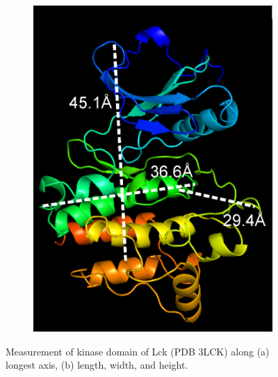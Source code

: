 \documentclass[../AdvancementSummary.tex]{subfiles}
\begin{document}
\begin{figure}
\begin{center}
\begin{subfigure}{0.4\linewidth}
\includegraphics[width=\linewidth]{LckPyMol/LWD.eps}
\caption{}
\end{subfigure}
\end{center}
\caption{Measurement of kinase domain of Lck (PDB 3LCK) along (a) longest axis, (b) length, width, and height. \label{fig: LckPyMol}}
\end{figure}



%
%
%
\end{document}
